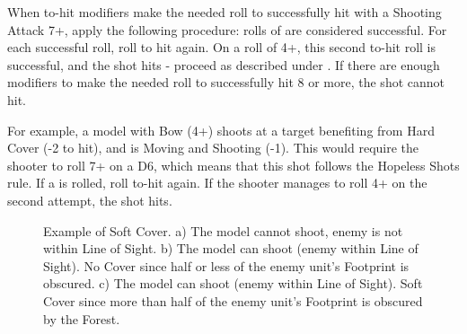 When to-hit modifiers make the needed roll to successfully hit with a Shooting Attack 7+, apply the following procedure: rolls of  are considered successful. For each successful roll, roll to hit again. On a roll of 4+, this second to-hit roll is successful, and the shot hits - proceed as described under . If there are enough modifiers to make the needed roll to successfully hit 8 or more, the shot cannot hit.

For example, a model with Bow (4+) shoots at a target benefiting from Hard Cover (-2 to hit), and is Moving and Shooting (-1). This would require the shooter to roll 7+ on a D6, which means that this shot follows the Hopeless Shots rule. If a  is rolled, roll to-hit again. If the shooter manages to roll 4+ on the second attempt, the shot hits.

\newcommand{\figureSCNotwithinlightofsight}{\smallfontsize{Not within Line of Sight}}
\newcommand{\figureSCA}{a)}
\newcommand{\figureSCB}{b)}
\newcommand{\figureSCC}{c)}
\newcommand{\figureSCWithinlightofsight}{\smallfontsize{Within Line of Sight}}
\newcommand{\figureSCLessthanhalfoffootprintobscured}{%
\begin{minipage}{0.105\unitlength}\begin{center}%
\smallfontsize{Less than half of Footprint obscured}%
\end{center}\end{minipage}}
\newcommand{\figureSCMorethanhalfoffootprintobscured}{%
\begin{minipage}{0.105\unitlength}\begin{center}%
\smallfontsize{More than half of Footprint obscured}%
\end{center}\end{minipage}}

\vspace*{10pt}

\begin{figure}[!htbp]
\centering
\def\svgwidth{\textwidth}

\caption{Example of Soft Cover.\captionpar
a) The model cannot shoot, enemy is not within Line of Sight.\captionpar
b) The model can shoot (enemy within Line of Sight). No Cover since half or less of the enemy unit's Footprint is obscured.\captionpar
c) The model can shoot (enemy within Line of Sight). Soft Cover since more than half of the enemy unit's Footprint is obscured by the Forest.}
\label{figure/soft_cover}
\end{figure}

